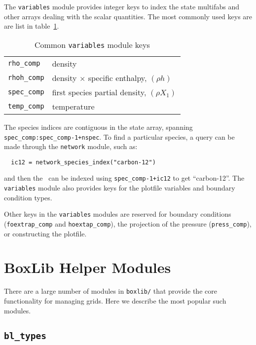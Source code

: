 \label{sec:variables_module}

The {\tt variables} module provides integer keys to index the state
multifabs and other arrays dealing with the scalar quantities.  The
most commonly used keys are are list in table~\ref{arch:table:variables}.

\begin{table}[h]
\caption{\label{arch:table:variables} Common {\tt variables} module keys}
\begin{center}
\begin{tabular}{ll}
\hline
{\tt rho\_comp}  & density \\
{\tt rhoh\_comp} & density $\times$ specific enthalpy, $(\rho h)$ \\
{\tt spec\_comp} & first species partial density, $(\rho X_1)$ \\
{\tt temp\_comp} & temperature \\
\hline
\end{tabular}
\end{center}
\end{table}

The species indices are contiguous in the state array, spanning {\tt
  spec\_comp:spec\_comp-1+nspec}.  To find a particular species, a
query can be made through the {\tt network} module, such as:
\begin{verbatim}
  ic12 = network_species_index("carbon-12")
\end{verbatim}
and then the \fab\ can be indexed using {\tt spec\_comp-1+ic12} to
get ``carbon-12''.
The {\tt variables} module also provides keys for the plotfile
variables and boundary condition types.

Other keys in the {\tt variables} modules are reserved for boundary
conditions ({\tt foextrap\_comp} and {\tt hoextap\_comp}), the
projection of the pressure ({\tt press\_comp}), or constructing
the plotfile.


\section{BoxLib Helper Modules}

There are a large number of modules in {\tt boxlib/} that provide
the core functionality for managing grids.  Here we describe
the most popular such modules.


\subsection{{\tt bl\_types}}

